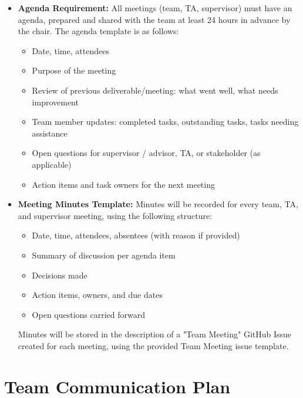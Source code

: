 \documentclass{article}
\begin{document}
\begin{itemize}
    \item \textbf{Agenda Requirement:} All meetings (team, TA, supervisor) must have an agenda, prepared and shared with the team at least 24 hours in advance by the chair. The agenda template is as follows:
          \begin{itemize}
              \item Date, time, attendees
              \item Purpose of the meeting
              \item Review of previous deliverable/meeting: what went well,
                    what needs improvement
              \item Team member updates: completed tasks, outstanding tasks,
                    tasks needing assistance
              \item Open questions for supervisor / advisor, TA, or stakeholder
                    (as applicable)
              \item Action items and task owners for the next meeting
          \end{itemize}

    \item \textbf{Meeting Minutes Template:} Minutes will be recorded for every team, TA, and supervisor meeting, using the following structure:
          \begin{itemize}
              \item Date, time, attendees, absentees (with reason if provided)
              \item Summary of discussion per agenda item
              \item Decisions made
              \item Action items, owners, and due dates
              \item Open questions carried forward
          \end{itemize}
          Minutes will be stored in the description of a "Team Meeting" GitHub Issue created for each meeting, using the provided Team Meeting issue template.

\end{itemize}

\section{Team Communication Plan}

\end{document}
